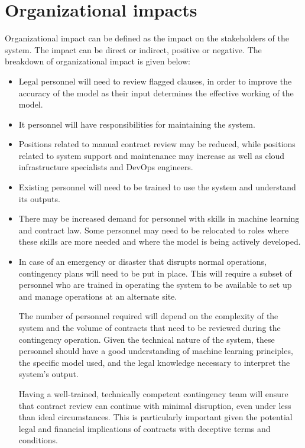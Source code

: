 \section{Organizational impacts \label{Section::Organizational Impacts}}
Organizational impact can be defined as the impact on the stakeholders of the system. The impact can be direct or indirect, positive or negative. The breakdown of organizational impact is given below: 
\begin{itemize}
    \item Legal personnel will need to review flagged clauses, in order to improve the accuracy of the model as their input determines the effective working of the model. 
    \item It personnel will have responsibilities for maintaining the system. 
    \item Positions related to manual contract review may be reduced, while positions related to system support and maintenance may increase as well as cloud infrastructure specialists and DevOps engineers. 
    \item Existing personnel will need to be trained to use the system and understand its outputs.

    \item There may be increased demand for personnel with skills in machine learning and contract law. Some personnel may need to be relocated to roles where these skills are more needed and where the model is being actively developed. 
    \item In case of an emergency or disaster that disrupts normal operations, contingency plans will need to be put in place. This will require a subset of personnel who are trained in operating the system to be available to set up and manage operations at an alternate site.

The number of personnel required will depend on the complexity of the system and the volume of contracts that need to be reviewed during the contingency operation. Given the technical nature of the system, these personnel should have a good understanding of machine learning principles, the specific model used, and the legal knowledge necessary to interpret the system's output.

Having a well-trained, technically competent contingency team will ensure that contract review can continue with minimal disruption, even under less than ideal circumstances. This is particularly important given the potential legal and financial implications of contracts with deceptive terms and conditions.




\end{itemize}




